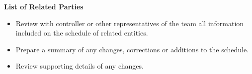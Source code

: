 \documentclass[
]{book}
\providecommand{\tightlist}{%
  \setlength{\itemsep}{0pt}\setlength{\parskip}{0pt}}
\begin{document}
\textbf{List of Related Parties}

\begin{itemize}
\tightlist
\item
  Review with controller or other representatives of the team all information included on the schedule of related entities.
\item
  Prepare a summary of any changes, corrections or additions to the schedule.
\item
  Review supporting details of any changes.
\end{itemize}
\end{document}
